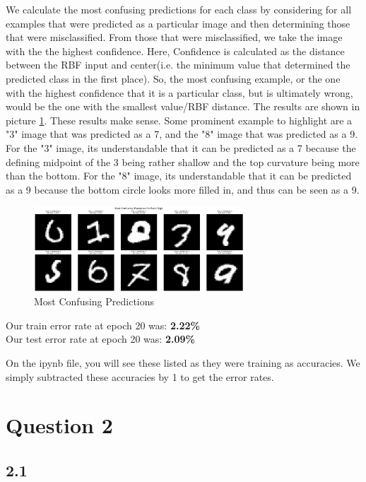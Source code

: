\documentclass{article}
\begin{document}
We calculate the most confusing predictions for each class by considering for all examples that were predicted as a particular image and then determining those that were misclassified. From those that were misclassified, we take the image with the the highest confidence. Here, Confidence is calculated
as the distance between the RBF input and center(i.e. the minimum value that determined the predicted class in the first place). So, the most confusing example, or the one with the highest confidence that it is a particular class, but is ultimately wrong, would be the one with the smallest value/RBF distance. The results are shown in
picture \ref{fig:3}. These results make sense. Some prominent example to highlight are a "3" image that was predicted as a 7, and the "8" image that was predicted as a 9. For the "3" image, its understandable that it can be predicted as a 7 because the defining midpoint of the 3 being rather shallow and the top curvature being more than the bottom. For the "8" image, its understandable that it can be predicted as a 9 because the bottom circle looks more filled in, and thus can be seen as a 9.
\begin{figure}[h]
    \centering
    \includegraphics[width=0.7\textwidth]{Assets/most-confusing.png}
    \caption{Most Confusing Predictions}
    \label{fig:3}
\end{figure}

\noindent Our train error rate at epoch 20 was: \textbf{2.22\%}\\
Our test error rate at epoch 20 was: \textbf{2.09\%}

On the ipynb file, you will see these listed as they were training as accuracies. We simply subtracted these accuracies by 1 to get the error rates.

\section{Question 2}

\subsection{2.1}
\end{document}

